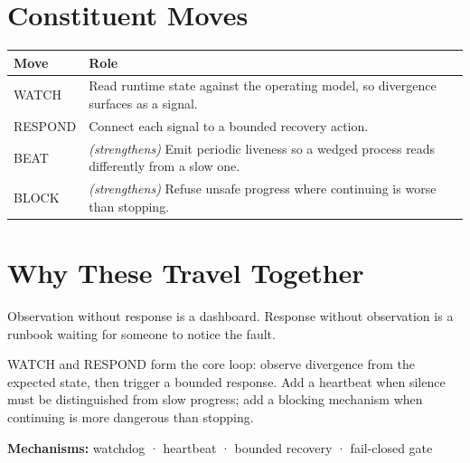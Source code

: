\section{Constituent Moves}\label{heading:constituent-moves}

{\footnotesize
{\def\LTcaptype{none} %
\begin{longtable}[]{@{}
  >{\raggedright\arraybackslash}p{}
  >{\raggedright\arraybackslash}p{}@{}}
\toprule\noalign{}
\begin{minipage}[b]{\linewidth}\raggedright
Move
\end{minipage} & \begin{minipage}[b]{\linewidth}\raggedright
Role
\end{minipage} \\
\midrule\noalign{}
\endhead
\bottomrule\noalign{}
\endlastfoot
WATCH & Read runtime state against the operating model, so divergence surfaces as a signal. \\
RESPOND & Connect each signal to a bounded recovery action. \\
BEAT & \emph{(strengthens)} Emit periodic liveness so a wedged process reads differently from a slow one. \\
BLOCK & \emph{(strengthens)} Refuse unsafe progress where continuing is worse than stopping. \\
\end{longtable}
}
}

\section{Why These Travel Together}\label{heading:why-these-travel-together}

Observation without response is a dashboard. Response without observation is a runbook waiting for someone to notice the fault.

WATCH and RESPOND form the core loop: observe divergence from the expected state, then trigger a bounded response. Add a heartbeat when silence must be distinguished from slow progress; add a blocking mechanism when continuing is more dangerous than stopping.

\textbf{Mechanisms:} watchdog · heartbeat · bounded recovery · fail-closed gate
